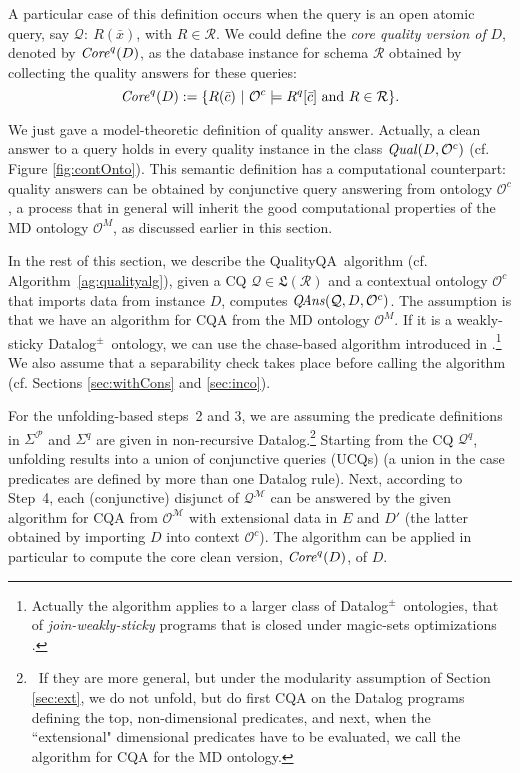\documentclass[format=acmsmall, review=false, screen=true]{acmart}
\newcommand{\ucq}{UCQ}
\newcommand{\mc}[1]{\mathcal{ #1}}
\newcommand{\mf}[1]{\mathfrak{ #1}}
\newcommand{\nit}[1]{{\it #1}}
\newcommand{\dpm}{{Datalog}$^\pm$}
\newcommand{\CQQA}{{\sf QualityQA}}
\begin{document}
A particular case of this definition occurs when the query is an open atomic query, say $\mc{Q}\!: \ R(\bar{x})$, with $R \in \mc{R}$.  We could define the {\em core quality version of} $D$, denoted by $\nit{Core}^q(D)$, as the database instance for schema $\mc{R}$ obtained by collecting  the quality answers for these queries:
\begin{equation}
\nit{Core}^q(D) := \{R(\bar{c}) ~|~ \mc{O}^c \models R^q[\bar{c}] \mbox{ and } R \in \mc{R}\}. \label{eq:core}
\end{equation}


 We just gave a model-theoretic definition of quality answer. Actually, a clean  answer to a query holds in every quality instance in the class  $\nit{Qual}(D,\mc{O}^c)$ (cf. Figure \ref{fig:contOnto}).
  This semantic definition has a computational counterpart: quality answers can be obtained by conjunctive query answering from ontology $\mc{O}^c$\!, a process that in general will inherit the  good computational properties of the MD ontology $\mc{O}^M$, as discussed earlier in this section.


In the rest of this section, we describe the \CQQA \ algorithm (cf. Algorithm~\ref{ag:qualityalg}), given a CQ $\mc{Q} \in \mf{L}(\mc{R})$ and a contextual ontology $\mc{O}^c$ that imports data from instance $D$,  computes $\nit{Q\!Ans}(\mc{Q},D,\mc{O}^c)$. The assumption is that we have an algorithm for CQA from the MD ontology $\mc{O}^M$. If it is a weakly-sticky \dpm \ ontology, we can use the chase-based algorithm introduced in \cite{milani16rr}.\footnote{Actually the algorithm applies to a larger class of \dpm \ ontologies, that of {\em join-weakly-sticky} programs that is closed under magic-sets optimizations \cite{milani16rr}.} We also assume that a separability check takes place before calling the algorithm
(cf. Sections \ref{sec:withCons} and \ref{sec:inco}).


 For the unfolding-based steps~2 and 3, we are assuming the predicate definitions in $\Sigma^\mc{P}$ and $\Sigma^q$ are given in non-recursive Datalog.\footnote{\ If they are more general, but under the modularity assumption of Section \ref{sec:ext}, we do not unfold, but do first CQA on the Datalog programs defining the top, non-dimensional predicates, and next, when the ``extensional" dimensional predicates have to be evaluated, we call the algorithm for CQA for the MD ontology.}
 Starting from the CQ $\mc{Q}^q$, unfolding results into a union of conjunctive queries (\ucq s) (a union in the case predicates are defined by more than one Datalog rule).
  Next, according to Step~4,  each (conjunctive) disjunct of $\mc{Q}^\mc{M}$ can be answered by the given algorithm for CQA from $\mc{O}^\mc{M}$ with extensional data in $E$ and $D'$ (the latter obtained by importing $D$ into context $\mc{O}^c$). The algorithm can be applied in particular to compute the core clean version, $\nit{Core}^q(D)$, of  $D$.
\end{document}
